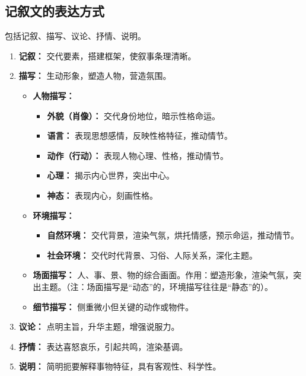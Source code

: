 \documentclass[11pt, a4paper]{ctexart}
\begin{document}
\subsection{记叙文的表达方式}
包括记叙、描写、议论、抒情、说明。
\begin{enumerate}
    \item \textbf{记叙：} 交代要素，搭建框架，使叙事条理清晰。
    \item \textbf{描写：} 生动形象，塑造人物，营造氛围。
        \begin{itemize}
            \item \textbf{人物描写：}
                \begin{itemize}
                    \item \textbf{外貌（肖像）：} 交代身份地位，暗示性格命运。
                    \item \textbf{语言：} 表现思想感情，反映性格特征，推动情节。
                    \item \textbf{动作（行动）：} 表现人物心理、性格，推动情节。
                    \item \textbf{心理：} 揭示内心世界，突出中心。
                    \item \textbf{神态：} 表现内心，刻画性格。
                \end{itemize}
            \item \textbf{环境描写：}
                \begin{itemize}
                    \item \textbf{自然环境：} 交代背景，渲染气氛，烘托情感，预示命运，推动情节。
                    \item \textbf{社会环境：} 交代时代背景、习俗、人际关系，深化主题。
                \end{itemize}
            \item \textbf{场面描写：} 人、事、景、物的综合画面。作用：塑造形象，渲染气氛，突出主题。（注：场面描写是“动态”的，环境描写往往是“静态”的）。
            \item \textbf{细节描写：} 侧重微小但关键的动作或物件。
        \end{itemize}
    \item \textbf{议论：} 点明主旨，升华主题，增强说服力。
    \item \textbf{抒情：} 表达喜怒哀乐，引起共鸣，渲染基调。
    \item \textbf{说明：} 简明扼要解释事物特征，具有客观性、科学性。
\end{enumerate}
\end{document}
